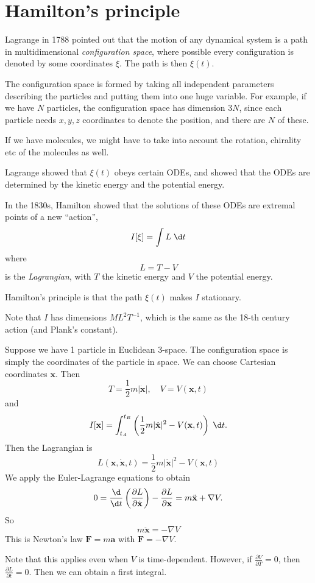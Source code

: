 \documentclass[a4paper]{article}
\begin{document}
\section{Hamilton's principle}
Lagrange in 1788 pointed out that the motion of any dynamical system is a path in multidimensional \emph{configuration space}, where possible every configuration is denoted by some coordinates $\xi$. The path is then $\xi(t)$.

The configuration space is formed by taking all independent parameters describing the particles and putting them into one huge variable. For example, if we have $N$ particles, the configuration space has dimension $3N$, since each particle needs $x, y, z$ coordinates to denote the position, and there are $N$ of these.

If we have molecules, we might have to take into account the rotation, chirality etc of the molecules as well.

Lagrange showed that $\xi(t)$ obeys certain ODEs, and showed that the ODEs are determined by the kinetic energy and the potential energy.

In the 1830s, Hamilton showed that the solutions of these ODEs are extremal points of a new ``action'',
\[
  I[\xi] = \int L\;\d t
\]
where
\[
  L = T - V
\]
is the \emph{Lagrangian}, with $T$ the kinetic energy and $V$ the potential energy.

Hamilton's principle is that the path $\xi(t)$ makes $I$ stationary.

Note that $I$ has dimensions $ML^2T^{-1}$, which is the same as the 18-th century action (and Plank's constant).

\begin{eg}
  Suppose we have 1 particle in Euclidean 3-space. The configuration space is simply the coordinates of the particle in space. We can choose Cartesian coordinates $\mathbf{x}$. Then
  \[
    T = \frac{1}{2}m|\dot{\mathbf{x}}|,\quad V = V(\mathbf{x}, t)
  \]
  and
  \[
    I[\mathbf{x}] = \int_{t_A}^{t_B}\left(\frac{1}{2}m|\dot{\mathbf{x}}|^2 - V(\mathbf{x}, t)\right)\;\d t.
  \]
  Then the Lagrangian is
  \[
    L(\mathbf{x}, \dot{\mathbf{x}}, t) = \frac{1}{2}m|\dot{\mathbf{x}}|^2 - V(\mathbf{x}, t)
  \]
  We apply the Euler-Lagrange equations to obtain
  \[
    0 = \frac{\d}{\d t}\left(\frac{\partial L}{\partial \dot{\mathbf{x}}}\right) - \frac{\partial L}{\partial \mathbf{x}} = m\ddot{\mathbf{x}} + \nabla V.
  \]
  So
  \[
    m\ddot{\mathbf{x}} = -\nabla V
  \]
  This is Newton's law $\mathbf{F} = m\mathbf{a}$ with $\mathbf{F} = -\nabla V$.
\end{eg}
Note that this applies even when $V$ is time-dependent. However, if $\frac{\partial V}{\partial T} = 0$, then $\frac{\partial L}{\partial t} = 0$. Then we can obtain a first integral.
\end{document}
